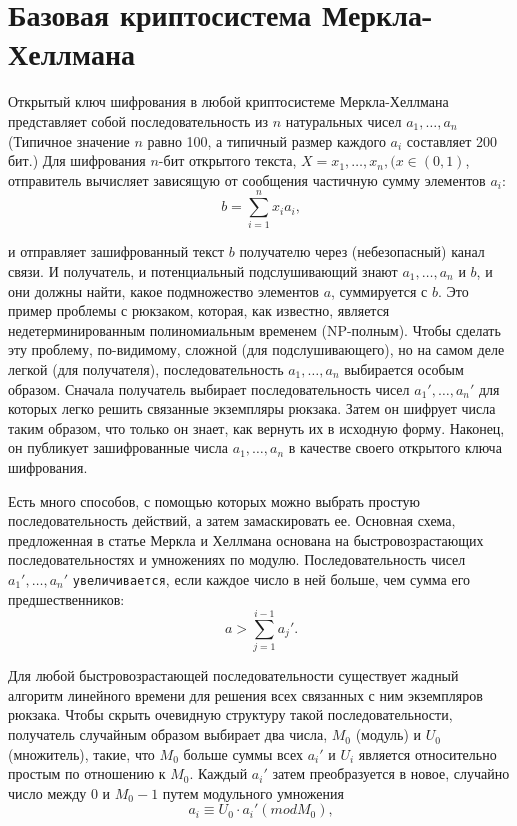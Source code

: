 \documentclass[a4paper,12pt]{report}
\newcommand{\mono}[1]{{\small\texttt{#1}}}
\begin{document}
\chapter{Базовая криптосистема Меркла-Хеллмана}\label{ch::basic}

Открытый ключ шифрования в любой криптосистеме Меркла-Хеллмана представляет собой последовательность из $n$ натуральных чисел $a_1,\ldots,a_n$ (Типичное значение $n$ равно 100, а типичный размер каждого $a_i$ составляет 200 бит.) Для шифрования $n$-бит открытого текста, $X = x_1,\ldots,x_n,(x \in (0, 1)$, отправитель вычисляет зависящую от сообщения частичную сумму элементов $a_i$:
\[
\ b = \sum_{i = 1}^n x_i a_i,
\]

\noindent и отправляет зашифрованный текст $b$ получателю через (небезопасный) канал связи. И получатель, и потенциальный подслушивающий знают $a_1,\ldots,a_n$ и $b$, и они должны найти, какое подмножество элементов $a$, суммируется с $b$. Это пример проблемы с рюкзаком, которая, как известно, является недетерминированным полиномиальным временем (NP-полным). Чтобы сделать эту проблему, по-видимому, сложной (для подслушивающего), но на самом деле легкой (для получателя), последовательность $a_1,\ldots,a_n$ выбирается особым образом. Сначала получатель выбирает последовательность чисел $a_1',\ldots,a_n'$ для которых легко решить связанные экземпляры рюкзака. Затем он шифрует числа таким образом, что только он знает, как вернуть их в исходную форму. Наконец, он публикует зашифрованные числа $a_1,\ldots,a_n$ в качестве своего открытого ключа шифрования.

Есть много способов, с помощью которых можно выбрать простую последовательность действий, а затем замаскировать ее. Основная схема, предложенная в статье Меркла и Хеллмана основана на быстровозрастающих последовательностях и умножениях по модулю. Последовательность чисел $a_1',\ldots,a_n'$ \mono{увеличивается}, если каждое число в ней больше, чем сумма его предшественников:
\[
\ a > \sum_{j = 1}^{i - 1} a_j'.
\]

\noindent Для любой быстровозрастающей последовательности существует жадный алгоритм линейного времени для решения всех связанных с ним экземпляров рюкзака. Чтобы скрыть очевидную структуру такой последовательности, получатель случайным образом выбирает два числа, $M_0$ (модуль) и $U_0$ (множитель), такие, что $M_0$ больше суммы всех $a_i'$ и $U_i$ является относительно простым по отношению к $M_0$. Каждый $a_i'$ затем преобразуется в новое, случайно число между 0 и $M_0 - 1$ путем модульного умножения
\[
\ a_i \equiv U_0 \cdot a_i' (mod M_0),
\]
\end{document}
